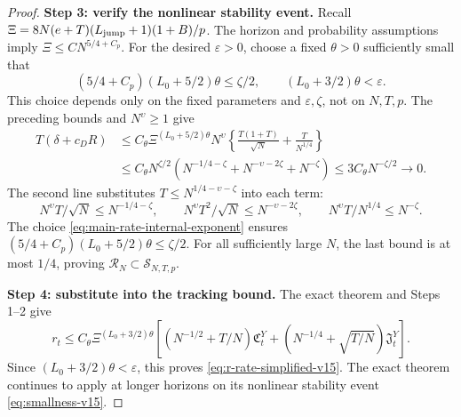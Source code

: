 \begin{proof}
\par\noindent\textbf{Step 3: verify the nonlinear stability event.}
Recall $\Xi=8N(e+T)(L_{\mathrm{jump}}+1)(1+B)/p$. The horizon and probability
assumptions imply $\Xi\le C N^{5/4+C_p}$. For the desired
$\varepsilon>0$, choose a fixed $\theta>0$ sufficiently small that
\begin{equation}
\label{eq:main-rate-internal-exponent}
 (5/4+C_p)(L_0+5/2)\theta\le\zeta/2,
 \qquad (L_0+3/2)\theta<\varepsilon.
\end{equation}
This choice depends only on the fixed parameters and $\varepsilon,\zeta$,
not on $N,T,p$. The preceding bounds and $N^\upsilon\ge1$ give
\[
\begin{aligned}
 T(\delta+c_DR)
 &\le C_\theta\Xi^{(L_0+5/2)\theta}N^\upsilon
       \left\{\frac{T(1+T)}{\sqrt N}+\frac{T}{N^{1/4}}\right\}\\
 &\le C_\theta N^{\zeta/2}
       (N^{-1/4-\zeta}+N^{-\upsilon-2\zeta}+N^{-\zeta})
 \le3C_\theta N^{-\zeta/2}\longrightarrow0.
\end{aligned}
\]
The second line substitutes $T\le N^{1/4-\upsilon-\zeta}$ into each term:
\[
 N^\upsilon T/\sqrt N\le N^{-1/4-\zeta},\qquad
 N^\upsilon T^2/\sqrt N\le N^{-\upsilon-2\zeta},\qquad
 N^\upsilon T/N^{1/4}\le N^{-\zeta}.
\]
The choice \eqref{eq:main-rate-internal-exponent} ensures
$(5/4+C_p)(L_0+5/2)\theta\le\zeta/2$.
For all sufficiently large $N$, the last bound is at most $1/4$, proving
$\mathcal R_N\subset\mathcal S_{N,T,p}$.

\par\noindent\textbf{Step 4: substitute into the tracking bound.}
The exact theorem and Steps 1--2 give
\[
 r_t\le C_\theta\Xi^{(L_0+3/2)\theta}
 \left[(N^{-1/2}+T/N)\mathfrak C_t^Y
 +(N^{-1/4}+\sqrt{T/N})\mathfrak J_t^Y\right].
\]
Since $(L_0+3/2)\theta<\varepsilon$, this proves
\eqref{eq:r-rate-simplified-v15}. The exact theorem continues to apply
at longer horizons on its nonlinear stability event \eqref{eq:smallness-v15}.
\end{proof}
